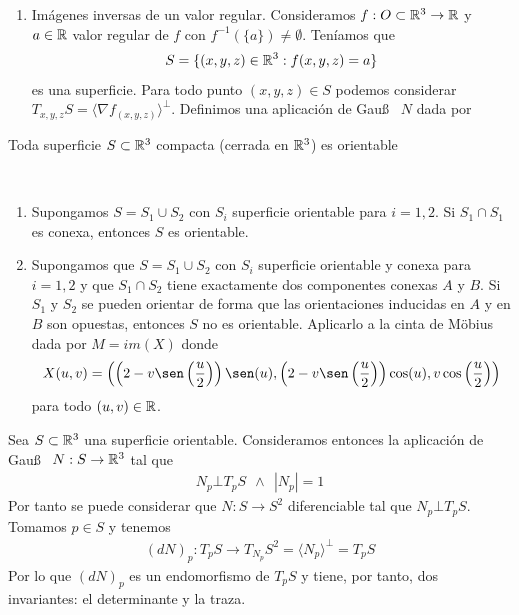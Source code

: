 \begin{ejemplo}
\begin{enumerate}
        \item Imágenes inversas de un valor regular. Consideramos $f: O \subset \mathbb{R}^3 \to \mathbb{R}$ y $a\in \mathbb{R}$ valor regular de $f$ con $f^{-1}(\{a\})\neq \emptyset$. Teníamos que 
        \begin{gather*}
            S = \{(x,y,z)\in \mathbb{R}^3 : f(x,y,z)=a\}
        \end{gather*}
        es una superficie. Para todo punto $(x,y,z)\in S$ podemos considerar $T_{x,y,z}S=\langle \nabla f_{(x,y,z)} \rangle ^{\bot}$. Definimos una aplicación de Gau\ss~ $N$ dada por 
    \end{enumerate}
\end{ejemplo}

\begin{teo}
    Toda superficie $S\subset \mathbb{R}^3$ compacta (cerrada en $\mathbb{R}^3$) es orientable
\end{teo}

\begin{ejercicio}\
    \begin{enumerate}
        \item Supongamos $S=S_1 \cup S_2$ con $S_i$ superficie orientable para $i=1,2$. Si $S_1\cap S_1$ es conexa, entonces $S$ es orientable.
        \item Supongamos que $S=S_1\cup S_2$ con $S_i$ superficie orientable y conexa para $i=1,2$ y que $S_1\cap S_2$ tiene exactamente dos componentes conexas $A$ y $B$. Si $S_1$ y $S_2$ se pueden orientar de forma que las orientaciones inducidas en $A$ y en $B$ son opuestas, entonces $S$ no es orientable. Aplicarlo a la cinta de Möbius dada por $M = im(X)$ donde
        \begin{gather*}
            X(u,v) = \left(\left(2 - v \sen\left(\frac{u}{2}\right)\right)\sen(u), \left(2 - v \sen \left(\frac{u}{2}\right)\right)\cos(u), v \cos \left(\frac{u}{2}\right)\right)
        \end{gather*}
        para todo $(u,v)\in \mathbb{R}$.
    \end{enumerate}
\end{ejercicio}

\begin{observacion}
    Sea $S\subset \mathbb{R}^3$ una superficie orientable. Consideramos entonces la aplicación de Gau\ss~ $N:S \to \mathbb{R}^3$ tal que 
    \begin{gather*}
        N_p\bot T_pS\ \ \wedge\ \ |N_p| = 1
    \end{gather*}
    Por tanto se puede considerar que $N:S\to S^2$ diferenciable tal que $N_p\bot T_pS$. Tomamos $p\in S$ y tenemos 
    \begin{gather*}
        (dN)_p : T_pS \to T_{N_p}S^2 = \langle N_p\rangle^\bot = T_pS
    \end{gather*}
    Por lo que $(dN)_p$ es un endomorfismo de $T_pS$ y tiene, por tanto, dos invariantes: el determinante y la traza.
\end{observacion}

